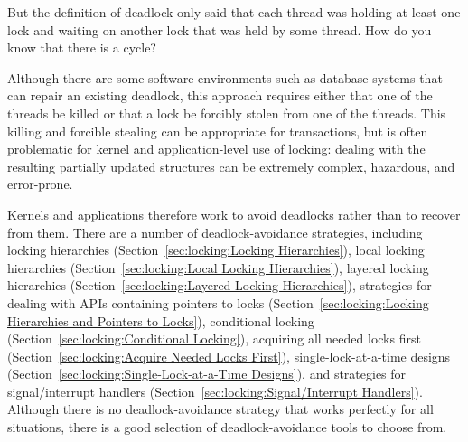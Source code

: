 \QuickQuiz{}
	But the definition of deadlock only said that each thread
	was holding at least one lock and waiting on another lock
	that was held by some thread.
	How do you know that there is a cycle?
 \QuickQuizEnd

Although there are some software environments such as database systems
that can repair an existing deadlock, this approach requires either that
one of the threads be killed or that a lock be forcibly stolen from one
of the threads.
This killing and forcible stealing can be appropriate for transactions,
but is often problematic for kernel and application-level use of locking:
dealing with the resulting partially updated structures can be extremely
complex, hazardous, and error-prone.

Kernels and applications therefore work to avoid deadlocks rather than to
recover from them.
There are a number of deadlock-avoidance strategies,
including locking hierarchies
(Section~\ref{sec:locking:Locking Hierarchies}),
local locking hierarchies
(Section~\ref{sec:locking:Local Locking Hierarchies}),
layered locking hierarchies
(Section~\ref{sec:locking:Layered Locking Hierarchies}),
strategies for dealing with APIs containing pointers to locks
(Section~\ref{sec:locking:Locking Hierarchies and Pointers to Locks}),
conditional locking
(Section~\ref{sec:locking:Conditional Locking}),
acquiring all needed locks first
(Section~\ref{sec:locking:Acquire Needed Locks First}),
single-lock-at-a-time designs
(Section~\ref{sec:locking:Single-Lock-at-a-Time Designs}),
and strategies for signal/interrupt handlers
(Section~\ref{sec:locking:Signal/Interrupt Handlers}).
Although there is no deadlock-avoidance strategy that works perfectly
for all situations, there is a good selection of deadlock-avoidance
tools to choose from.

